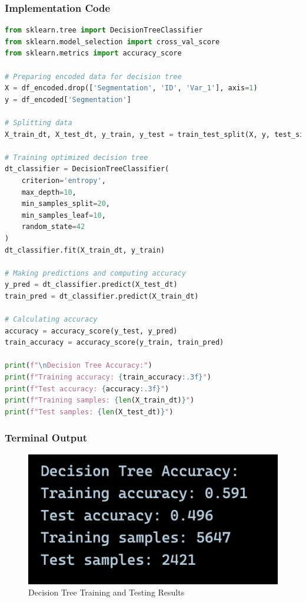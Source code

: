 \documentclass[12pt,a4paper]{article}
\begin{document}
\subsubsection{Implementation Code}
\begin{lstlisting}[language=Python, caption=Train/Test a Decision Tree on a Labelled Dataset]
from sklearn.tree import DecisionTreeClassifier
from sklearn.model_selection import cross_val_score
from sklearn.metrics import accuracy_score

# Preparing encoded data for decision tree 
X = df_encoded.drop(['Segmentation', 'ID', 'Var_1'], axis=1)
y = df_encoded['Segmentation']

# Splitting data
X_train_dt, X_test_dt, y_train, y_test = train_test_split(X, y, test_size=0.3, random_state=42)

# Training optimized decision tree
dt_classifier = DecisionTreeClassifier(
	criterion='entropy',
    max_depth=10,
    min_samples_split=20,
    min_samples_leaf=10,
    random_state=42
)
dt_classifier.fit(X_train_dt, y_train)

# Making predictions and computing accuracy
y_pred = dt_classifier.predict(X_test_dt)
train_pred = dt_classifier.predict(X_train_dt)

# Calculating accuracy
accuracy = accuracy_score(y_test, y_pred)
train_accuracy = accuracy_score(y_train, train_pred)

print(f"\nDecision Tree Accuracy:")
print(f"Training accuracy: {train_accuracy:.3f}")
print(f"Test accuracy: {accuracy:.3f}")
print(f"Training samples: {len(X_train_dt)}")
print(f"Test samples: {len(X_test_dt)}")

\end{lstlisting}

\subsubsection{Terminal Output}

\begin{figure}[h!]
    \centering
    \includegraphics[width=\textwidth]{Figures/dt_accuracy_result.png}
    \caption{Decision Tree Training and Testing Results}
\end{figure}
\end{document}
